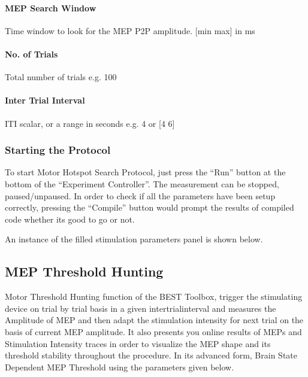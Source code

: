 \documentclass[letterpaper,10pt,english]{sphinxmanual}
\begin{document}
\paragraph{MEP Search Window}
\label{\detokenize{6_MEPHotspotSearch:mep-search-window}}
\sphinxAtStartPar
Time window to look for the MEP P2P amplitude. {[}min max{]} in ms


\paragraph{No. of Trials}
\label{\detokenize{6_MEPHotspotSearch:no-of-trials}}
\sphinxAtStartPar
Total number of trials e.g. 100


\paragraph{Inter Trial Interval}
\label{\detokenize{6_MEPHotspotSearch:inter-trial-interval}}
\sphinxAtStartPar
ITI scalar, or a range in seconds e.g. 4 or {[}4 6{]}


\subsubsection{Starting the Protocol}
\label{\detokenize{6_MEPHotspotSearch:starting-the-protocol}}
\sphinxAtStartPar
To start Motor Hotspot Search Protocol, just press the “Run” button at the bottom of the “Experiment Controller”. The measurement can be stopped, paused/unpaused. In order to check if all the parameters have been setup correctly, pressing the “Compile” button would prompt the results of compiled code whether its good to go or not.

\sphinxAtStartPar
An instance of the filled stimulation parameters panel is shown below.

\begin{figure}[htbp]
\centering

\noindent{}
\end{figure}


\subsection{MEP Threshold Hunting}
\label{\detokenize{7_MEPThresholdHunting:mep-threshold-hunting}}\label{\detokenize{7_MEPThresholdHunting::doc}}
\sphinxAtStartPar
Motor Threshold Hunting function of the BEST Toolbox, trigger the stimulating device on trial by trial basis in a given inter\sphinxhyphen{}trial\sphinxhyphen{}interval and measures the Amplitude of MEP and then adapt the stimulation intensity for next trial on the basis of current MEP amplitude. It also presents you online results of MEPs and Stimulation Intensity traces in order to visualize the MEP shape and its threshold stability throughout the procedure. In its advanced form, Brain State\sphinxhyphen{} Dependent MEP Threshold using the parameters given below.
\end{document}
